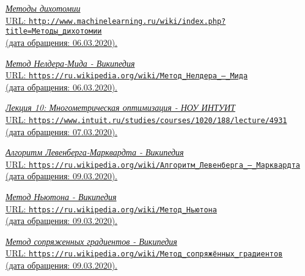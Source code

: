 \begin{thebibliography}{99}
\href{http://www.machinelearning.ru/wiki/index.php?title=%D0%9C%D0%B5%D1%82%D0%BE%D0%B4%D1%8B_%D0%B4%D0%B8%D1%85%D0%BE%D1%82%D0%BE%D0%BC%D0%B8%D0%B8}{{\itshape Методы дихотомии} \\URL: \texttt{http://www.machinelearning.ru/wiki/index.php?title=Методы\_дихотомии} \\ (дата обращения: 06.03.2020).}

\href{https://ru.wikipedia.org/wiki/%D0%9C%D0%B5%D1%82%D0%BE%D0%B4_%D0%9D%D0%B5%D0%BB%D0%B4%D0%B5%D1%80%D0%B0_%E2%80%94_%D0%9C%D0%B8%D0%B4%D0%B0}{{\itshape Метод Нелдера-Мида - Википедия} \\URL: \texttt{https://ru.wikipedia.org/wiki/Метод\_Нелдера\_—\_Мида} \\ (дата обращения: 06.03.2020).}

\href{https://www.intuit.ru/studies/courses/1020/188/lecture/4931}{{\itshape Лекция 10: Многометрическая оптимизация - НОУ ИНТУИТ} \\URL: \texttt{https://www.intuit.ru/studies/courses/1020/188/lecture/4931} \\ (дата обращения: 07.03.2020).}

\href{https://ru.wikipedia.org/wiki/%D0%90%D0%BB%D0%B3%D0%BE%D1%80%D0%B8%D1%82%D0%BC_%D0%9B%D0%B5%D0%B2%D0%B5%D0%BD%D0%B1%D0%B5%D1%80%D0%B3%D0%B0_%E2%80%94_%D0%9C%D0%B0%D1%80%D0%BA%D0%B2%D0%B0%D1%80%D0%B4%D1%82%D0%B0}{{\itshape Алгоритм Левенберга-Марквардта - Википедия} \\URL: \texttt{https://ru.wikipedia.org/wiki/Алгоритм\_Левенберга\_—\_Марквардта} \\ (дата обращения: 09.03.2020).}

\href{https://ru.wikipedia.org/wiki/%D0%9C%D0%B5%D1%82%D0%BE%D0%B4_%D0%9D%D1%8C%D1%8E%D1%82%D0%BE%D0%BD%D0%B0}{{\itshape Метод Ньютона - Википедия} \\URL: \texttt{https://ru.wikipedia.org/wiki/Метод\_Ньютона} \\ (дата обращения: 09.03.2020).}

\href{https://ru.wikipedia.org/wiki/%D0%9C%D0%B5%D1%82%D0%BE%D0%B4_%D1%81%D0%BE%D0%BF%D1%80%D1%8F%D0%B6%D1%91%D0%BD%D0%BD%D1%8B%D1%85_%D0%B3%D1%80%D0%B0%D0%B4%D0%B8%D0%B5%D0%BD%D1%82%D0%BE%D0%B2}{{\itshape Метод сопряженных градиентов - Википедия} \\URL: \texttt{https://ru.wikipedia.org/wiki/Метод\_сопряжённых\_градиентов} \\ (дата обращения: 09.03.2020).}

\end{thebibliography}
\pagebreak

